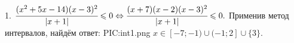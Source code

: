 1. $\cfrac{(x^2+5x-14)(x-3)^2}{|x+1|}\leqslant0\Leftrightarrow\cfrac{(x+7)(x-2)(x-3)^2}{|x+1|}\leqslant0.$ Применив метод интервалов, найдём ответ:
{{PIC:int1.png}}
$x\in[-7;-1)\cup(-1;2]\cup\{3\}.$\\
